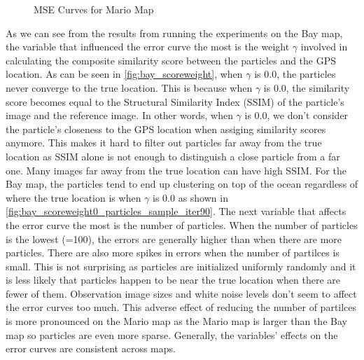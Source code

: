 \documentclass{article}
\begin{document}
\begin{figure}[!ht]
    \hspace{0.2cm}%
    \vspace{-0.4cm}
    \caption{MSE Curves for Mario Map}
    \label{fig:mario}
    \vspace{-0.3cm}
\end{figure}
As we can see from the results from running the experiments on the Bay map, the variable that influenced the error curve the most is the weight $\gamma$ involved in calculating the composite similarity score between the particles and the GPS location. As can be seen in \ref{fig:bay_scoreweight}, when $\gamma$ is 0.0, the particles never converge to the true location. This is because when $\gamma$ is 0.0, the similarity score becomes equal to the Structural Similarity Index (SSIM) of the particle's image and the reference image. In other words, when $\gamma$ is 0.0, we don't consider the particle's closeness to the GPS location when assiging similarity scores anymore. This makes it hard to filter out particles far away from the true location as SSIM alone is not enough to distinguish a close particle from a far one. Many images far away from the true location can have high SSIM. For the Bay map, the particles tend to end up clustering on top of the ocean regardless of where the true location is when $\gamma$ is 0.0 as shown in \ref{fig:bay_scoreweight0_particles_sample_iter90}.
The next variable that affects the error curve the most is the number of particles. When the number of particles is the lowest (=100), the errors are generally higher than when there are more particles. There are also more spikes in errors when the number of partilces is small. This is not surprising as particles are initialized uniformly randomly and it is less likely that particles happen to be near the true location when there are fewer of them. Observation image sizes and white noise levels don't seem to affect the error curves too much. This adverse effect of reducing the number of partilces is more pronounced on the Mario map as the Mario map is larger than the Bay map so particles are even more sparse. Generally, the variables' effects on the error curves are consistent across maps.
\end{document}
